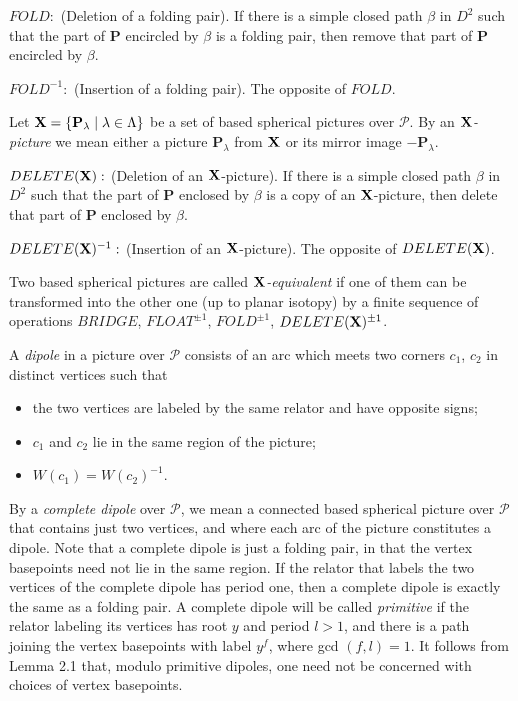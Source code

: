 \documentclass[12pt,reqno]{amsart}
\begin{document}
$FOLD:$ (Deletion of a folding pair). If there is a simple closed path $\beta$ in $D^2$ such that the part of $\mathbf{P}$ encircled by $\beta$ is a folding pair, then remove that part of $\mathbf{P}$ encircled by $\beta$.

$FOLD^{-1}:$ (Insertion of a folding pair). The opposite of $FOLD$.

Let ${\bf X} = \{\mathbf{P}_{\lambda}\mid \lambda\in \Lambda\}$ be a set of based spherical pictures  over $\mathcal{P}$. By an {\it $\bf X$-picture} we mean either a picture $\mathbf{P}_{\lambda}$ from ${\bf X}$ or its mirror image $-\mathbf{P}_{\lambda}$.


$DELETE({\bf X}):$ (Deletion of an $\bf X$-picture). If there is a simple closed path $\beta$ in $D^2$ such that the part of $\mathbf{P}$ enclosed by $\beta$ is a copy of an  ${\bf X}$-picture, then delete that part of $\mathbf{P}$ enclosed by $\beta$.

$DELETE({\bf X})^{-1}:$ (Insertion of an $\bf X$-picture). The opposite of $DELETE({\bf X})$.

Two based spherical pictures are called {\it ${\bf X}$-equivalent} if one of them can be transformed into the other one (up to planar isotopy) by a finite sequence of operations $BRIDGE$, $FLOAT^{\pm 1}$, $FOLD^{\pm 1}$, $DELETE({\bf X})^{\pm 1}$.

A {\it dipole} in a picture over $\mathcal{P}$ consists of an arc which meets two corners $c_1$, $c_2$ in distinct vertices such that
\begin{itemize}
\item the two vertices are labeled by the same relator and have opposite signs;
\item $c_1$ and $c_2$ lie in the same region of the picture;
\item $W(c_1) = W(c_2)^{-1}$.
\end{itemize}

By a {\it complete dipole} over $\mathcal{P}$, we mean a connected based spherical picture over $\mathcal{P}$ that contains just two vertices, and where each arc of the picture constitutes a dipole. Note that a complete dipole is just a folding pair, in that  the vertex basepoints need not lie in the same region. If the relator that labels the two vertices  of the complete dipole has period one, then a complete dipole is exactly the same as a folding pair.  A complete dipole will be called {\it primitive} if the relator labeling its vertices  has root $y$ and period $l>1$, and there is a path joining the vertex basepoints with label $y^f$, where {\rm gcd} $(f,l)=1$.
It follows from Lemma 2.1 \cite{gener_b_pr} that, modulo primitive dipoles, one need not be concerned with choices of vertex basepoints.
\end{document}
